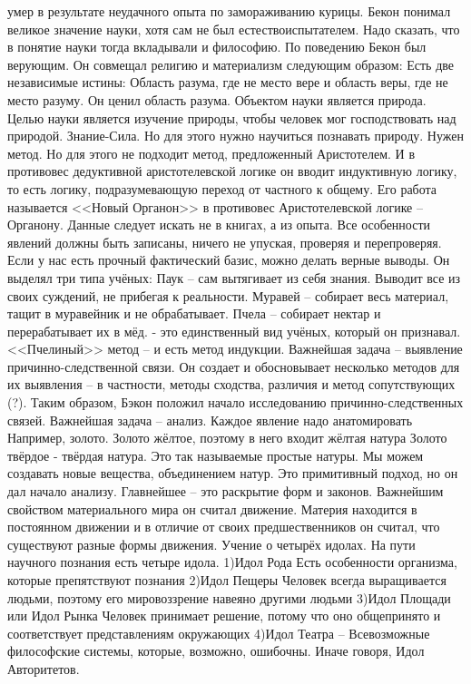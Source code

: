 умер в результате неудачного опыта по замораживанию курицы. Бекон понимал великое значение науки, хотя сам не был естествоиспытателем. Надо сказать, что в понятие науки тогда вкладывали и философию.
По поведению Бекон был верующим. Он совмещал религию и материализм следующим образом: Есть две независимые истины: Область разума, где не место вере и область веры, где не место разуму. Он ценил область разума. Объектом науки является природа. Целью науки является изучение природы, чтобы человек мог господствовать над природой. Знание-Сила. Но для этого нужно научиться познавать природу. Нужен метод. Но для этого не подходит метод, предложенный Аристотелем. И в противовес дедуктивной аристотелевской логике он вводит индуктивную логику, то есть логику, подразумевающую переход от частного к общему. Его работа называется <<Новый Органон>> в противовес Аристотелевской логике – Органону. Данные следует искать не в книгах, а из опыта. Все особенности явлений должны быть записаны, ничего не упуская, проверяя и перепроверяя. Если у нас есть прочный фактический базис, можно делать верные выводы. Он выделял три типа учёных: Паук – сам вытягивает из себя знания. Выводит все из своих суждений, не прибегая к реальности. Муравей – собирает весь материал, тащит в муравейник и не обрабатывает. Пчела – собирает нектар и перерабатывает их в мёд. - это единственный вид учёных, который он признавал. <<Пчелиный>> метод – и есть метод индукции. Важнейшая задача – выявление причинно-следственной связи. Он создает и обосновывает несколько методов для их выявления – в частности, методы сходства, различия и метод сопутствующих (?). Таким образом, Бэкон положил начало исследованию причинно-следственных связей. Важнейшая задача – анализ. Каждое явление надо анатомировать Например, золото. Золото жёлтое, поэтому в него входит жёлтая натура Золото твёрдое - твёрдая натура. Это так называемые простые натуры. Мы можем создавать новые вещества, объединением натур. Это примитивный подход, но он дал начало анализу. Главнейшее – это раскрытие форм и законов. Важнейшим свойством материального мира он считал движение. Материя находится в постоянном движении и в отличие от своих предшественников он считал, что существуют разные формы движения. Учение о четырёх идолах. На пути научного познания есть четыре идола. 1)Идол Рода Есть особенности организма, которые препятствуют познания 2)Идол Пещеры Человек всегда выращивается людьми, поэтому его мировоззрение навеяно другими людьми 3)Идол Площади или Идол Рынка Человек принимает решение, потому что оно общепринято и соответствует представлениям окружающих 4)Идол Театра – Всевозможные философские системы, которые, возможно, ошибочны. Иначе говоря, Идол Авторитетов.
